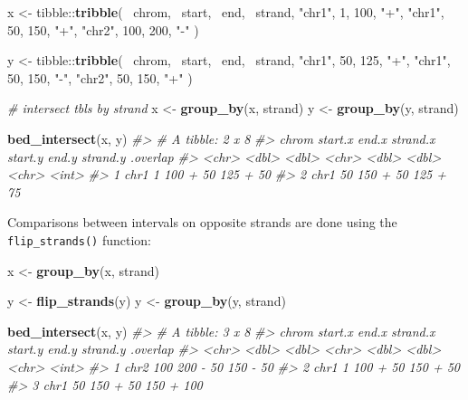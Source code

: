 \documentclass[9pt,a4paper]{extarticle}
\renewcommand{\KeywordTok}[1]{\textbf{{#1}}}
\renewcommand{\DecValTok}[1]{\textcolor[rgb]{0.00,0.00,1.00}{{#1}}}
\renewcommand{\StringTok}[1]{\textcolor[rgb]{0.87,0.00,0.00}{{#1}}}
\renewcommand{\CommentTok}[1]{\textcolor[rgb]{0.50,0.50,0.50}{\textit{{#1}}}}
\renewcommand{\NormalTok}[1]{{#1}}
\begin{document}
\begin{Highlighting}[]
\NormalTok{x <-}\StringTok{ }\NormalTok{tibble::}\KeywordTok{tribble}\NormalTok{(}
  \NormalTok{~chrom, ~start, ~end, ~strand,}
  \StringTok{"chr1"}\NormalTok{, }\DecValTok{1}\NormalTok{,      }\DecValTok{100}\NormalTok{,  }\StringTok{"+"}\NormalTok{,}
  \StringTok{"chr1"}\NormalTok{, }\DecValTok{50}\NormalTok{,     }\DecValTok{150}\NormalTok{,  }\StringTok{"+"}\NormalTok{,}
  \StringTok{"chr2"}\NormalTok{, }\DecValTok{100}\NormalTok{,    }\DecValTok{200}\NormalTok{,  }\StringTok{"-"}
\NormalTok{)}

\NormalTok{y <-}\StringTok{ }\NormalTok{tibble::}\KeywordTok{tribble}\NormalTok{(}
  \NormalTok{~chrom, ~start, ~end, ~strand,}
  \StringTok{"chr1"}\NormalTok{, }\DecValTok{50}\NormalTok{,     }\DecValTok{125}\NormalTok{,  }\StringTok{"+"}\NormalTok{,}
  \StringTok{"chr1"}\NormalTok{, }\DecValTok{50}\NormalTok{,     }\DecValTok{150}\NormalTok{,  }\StringTok{"-"}\NormalTok{,}
  \StringTok{"chr2"}\NormalTok{, }\DecValTok{50}\NormalTok{,     }\DecValTok{150}\NormalTok{,  }\StringTok{"+"}
\NormalTok{)}

\CommentTok{# intersect tbls by strand}
\NormalTok{x <-}\StringTok{ }\KeywordTok{group_by}\NormalTok{(x, strand)}
\NormalTok{y <-}\StringTok{ }\KeywordTok{group_by}\NormalTok{(y, strand)}

\KeywordTok{bed_intersect}\NormalTok{(x, y)}
\CommentTok{#> # A tibble: 2 x 8}
\CommentTok{#>   chrom start.x end.x strand.x start.y end.y strand.y .overlap}
\CommentTok{#>   <chr>   <dbl> <dbl>    <chr>   <dbl> <dbl>    <chr>    <int>}
\CommentTok{#> 1  chr1       1   100        +      50   125        +       50}
\CommentTok{#> 2  chr1      50   150        +      50   125        +       75}
\end{Highlighting}

Comparisons between intervals on opposite strands are done using the
\texttt{flip\_strands()} function:

\begin{Highlighting}[]
\NormalTok{x <-}\StringTok{ }\KeywordTok{group_by}\NormalTok{(x, strand)}

\NormalTok{y <-}\StringTok{ }\KeywordTok{flip_strands}\NormalTok{(y)}
\NormalTok{y <-}\StringTok{ }\KeywordTok{group_by}\NormalTok{(y, strand)}

\KeywordTok{bed_intersect}\NormalTok{(x, y)}
\CommentTok{#> # A tibble: 3 x 8}
\CommentTok{#>   chrom start.x end.x strand.x start.y end.y strand.y .overlap}
\CommentTok{#>   <chr>   <dbl> <dbl>    <chr>   <dbl> <dbl>    <chr>    <int>}
\CommentTok{#> 1  chr2     100   200        -      50   150        -       50}
\CommentTok{#> 2  chr1       1   100        +      50   150        +       50}
\CommentTok{#> 3  chr1      50   150        +      50   150        +      100}
\end{Highlighting}
\end{document}
